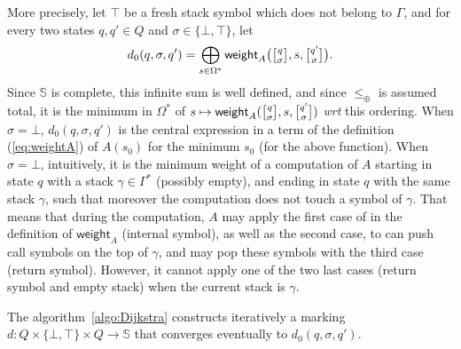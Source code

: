 \documentclass[runningheads]{llncs}
\def\wrt{\textit{wrt}\xspace}
\def\<#1>{\langle #1 \rangle}
\newcommand{\Semiring}{\mathbb{S}}
\def\weight{\mathsf{weight}}
\newcommand{\config}[2]{\ensuremath \genfrac{[}{]}{0pt}{}{#1}{#2}}
\begin{document}
\noindent
More precisely, 
let $\top$ be a fresh stack symbol which does not belong to $\Gamma$,
and for every two states $q, q' \in Q$ and $\sigma \in \{ \bot, \top \}$, 
let 
\[ 
  d_0(q, \sigma, q') = \bigoplus_{s\in \Omega^*} 
  \textstyle
  \weight_A\bigl(\config{q}{\sigma}, s, \config{q'}{\sigma}\bigr). 
\]
Since $\Semiring$ is complete, this infinite sum is well defined, 
and since $\leq_\oplus$ is assumed total, it is the minimum in $\Omega^*$
of $s \mapsto \weight_A(\config{q}{\sigma}, s, \config{q'}{\sigma})$ \wrt this ordering.
%
When $\sigma = \bot$, $d_0(q, \sigma, q')$ is the central 
expression in a term of the definition (\ref{eq:weightA}) of $A(s_0)$ for the minimum $s_0$
(for the above function).
When $\sigma = \bot$, intuitively, it is the minimum weight of a computation of $A$
starting in state $q$ with a stack $\gamma \in \Gamma^*$ (possibly empty), 
and ending in state $q$ with the same stack $\gamma$, such that moreover 
the computation does not touch a symbol of $\gamma$. 
That means that during the computation, 
$A$ may apply the first case of in the definition of $\weight_A$ (internal symbol),
as well as the second case, to can push call symbols on the top of $\gamma$, 
and may pop these symbols with the third case (return symbol). 
However, it cannot apply one of the two last cases (return symbol and empty stack)
when the current stack is $\gamma$.

The algorithm~\ref{algo:Dijkstra}
constructs iteratively a marking $d : Q \times \{ \bot, \top \} \times Q \to \Semiring$
that converges eventually to $d_0(q, \sigma, q')$. 
\end{document}
